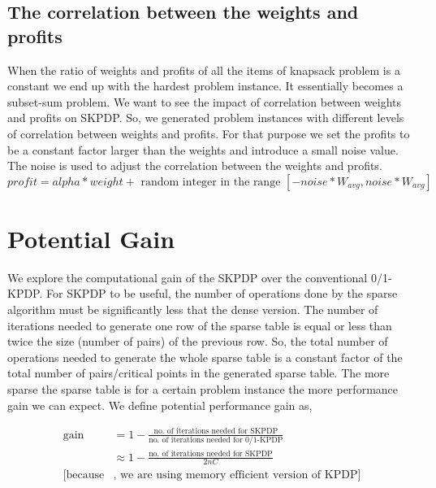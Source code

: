 \subsection{The correlation between the weights and profits}
When the ratio of weights and profits of all the items of knapsack problem is a constant we end up with the hardest problem instance. It essentially becomes a subset-sum problem. We want to see the impact of correlation between weights and profits on SKPDP. So, we generated problem instances with different levels of correlation between weights and profits. For that purpose we set the profits to be a constant factor larger than the weights and introduce a small noise value. The noise is used to adjust the correlation between the weights and profits.
\[
profit = alpha * weight + \text{ random integer in the range } [-noise*W_{avg},noise*W_{avg}]
\]









\section{Potential Gain}
We explore the computational gain of the SKPDP over the conventional 0/1-KPDP.
For SKPDP to be useful, the number of operations done by the sparse algorithm
must be significantly less that the dense version.  The number of iterations
needed to generate one row of the sparse table is equal or less than twice the
size (number of pairs) of the previous row.  So, the total number of
operations needed to generate the whole sparse table is a constant factor of
the total number of pairs/critical points in the generated sparse table.  The
more sparse the sparse table is for a certain problem instance the more
performance gain we can expect.  We define potential performance gain as,

\begin{align}
  \label{eq:2}
  \text{gain} &= 1 - \frac{\text{no.\ of iterations needed for
                SKPDP}}{\text{no.\ of iterations needed for 0/1-KPDP}}
                \nonumber \\
              &\approx 1 - \frac{\text{no. of iterations needed for
                SKPDP}}{2nC} \\
  [\text{because}&\text{, we are using memory efficient version of KPDP}]
                   \nonumber
\end{align}

